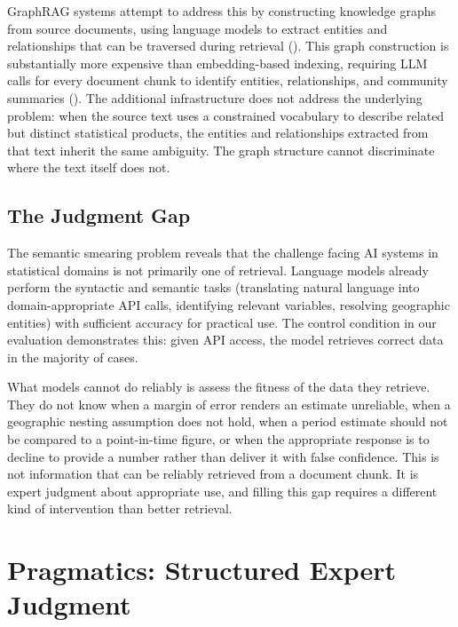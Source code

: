 \documentclass[
  11pt,
  letterpaper,
]{article}
\begin{document}
GraphRAG systems attempt to address this by constructing knowledge
graphs from source documents, using language models to extract entities
and relationships that can be traversed during retrieval
(). This graph
construction is substantially more expensive than embedding-based
indexing, requiring LLM calls for every document chunk to identify
entities, relationships, and community summaries
(). The
additional infrastructure does not address the underlying problem: when
the source text uses a constrained vocabulary to describe related but
distinct statistical products, the entities and relationships extracted
from that text inherit the same ambiguity. The graph structure cannot
discriminate where the text itself does not.

\subsection{The Judgment Gap}\label{the-judgment-gap}

The semantic smearing problem reveals that the challenge facing AI
systems in statistical domains is not primarily one of retrieval.
Language models already perform the syntactic and semantic tasks
(translating natural language into domain-appropriate API calls,
identifying relevant variables, resolving geographic entities) with
sufficient accuracy for practical use. The control condition in our
evaluation demonstrates this: given API access, the model retrieves
correct data in the majority of cases.

What models cannot do reliably is assess the fitness of the data they
retrieve. They do not know when a margin of error renders an estimate
unreliable, when a geographic nesting assumption does not hold, when a
period estimate should not be compared to a point-in-time figure, or
when the appropriate response is to decline to provide a number rather
than deliver it with false confidence. This is not information that can
be reliably retrieved from a document chunk. It is expert judgment about
appropriate use, and filling this gap requires a different kind of
intervention than better retrieval.

\section{Pragmatics: Structured Expert
Judgment}\label{pragmatics-structured-expert-judgment}
\end{document}

